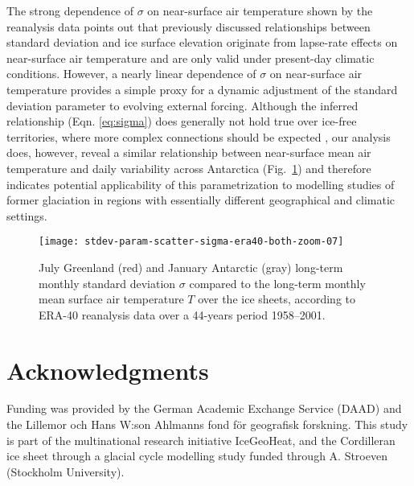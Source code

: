 \documentclass[review]{igs}
\begin{document}
The strong dependence of $\sigma$ on near-surface air temperature shown by the reanalysis data points out that previously discussed relationships between standard deviation and ice surface elevation \citep{fausto-etal-2009,fausto-etal-2011} originate from lapse-rate effects on near-surface air temperature and are only valid under present-day climatic conditions. However, a nearly linear dependence of $\sigma$ on near-surface air temperature provides a simple proxy for a dynamic adjustment of the standard deviation parameter to evolving external forcing. Although the inferred relationship (Eqn. \ref{eq:sigma}) does generally not hold true over ice-free territories, where more complex connections should be expected \citep{seguinot-2013}, our analysis does, however, reveal a similar relationship between near-surface mean air temperature and daily variability across Antarctica (Fig.~\ref{fig:both}) and therefore indicates potential applicability of this parametrization to modelling studies of former glaciation in regions with essentially different geographical and climatic settings.

\begin{figure}
    \centering\texttt{[image: stdev-param-scatter-sigma-era40-both-zoom-07]}
    \caption{July Greenland (red) and January Antarctic (gray) long-term monthly standard deviation $\sigma$ compared to the long-term monthly mean surface air temperature $T$ over the ice sheets, according to ERA-40 reanalysis data \citep{uppala-etal-2005} over a 44-years period 1958–2001.}
    \label{fig:both}
\end{figure}


\section{Acknowledgments}

Funding was provided by the German Academic Exchange Service (DAAD) and the Lillemor och Hans W:son Ahlmanns fond för geografisk forskning. This study is part of the multinational research initiative IceGeoHeat, and the Cordilleran ice sheet through a glacial cycle modelling study funded through A. Stroeven (Stockholm University).



\end{document}
